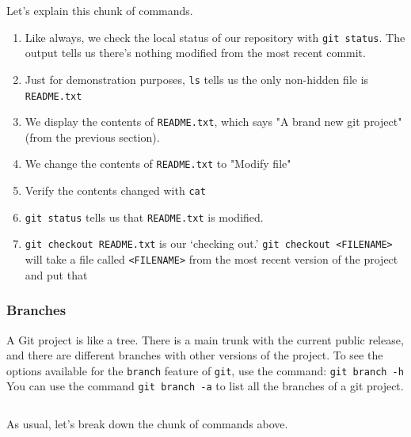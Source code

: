 \documentclass[11pt,fleqn]{article}
\theoremstyle{definition}
\begin{document}
Let's explain this chunk of commands.

\begin{enumerate}
\item Like always, we check the local status of our repository with \verb|git status|.
    The output tells us there's nothing modified from the most recent
    commit.

\item Just for demonstration purposes, \verb|ls| tells us the only non-hidden
    file is \verb|README.txt|

\item We display the contents of \verb|README.txt|, which says "A brand new git
    project" (from the previous section).

\item We change the contents of \verb|README.txt| to "Modify file"

\item Verify the contents changed with \verb|cat|

\item \verb|git status| tells us that \verb|README.txt| is modified.

\item \verb|git checkout README.txt| is our `checking out.' \verb|git checkout <FILENAME>|
    will take a file called \verb|<FILENAME>| from the most recent
    version of the project and put that 

\end{enumerate}

\subsubsection{Branches}
A Git project is like a tree. There is a main trunk with the current public
release, and there are different branches with other versions of the project. To
see the options available for the \verb|branch| feature of \verb|git|, use the
command: \texttt{git branch -h}\\
You can use the command \verb|git branch -a| to list all the branches of a git
project.

\begin{verbatim}
\end{verbatim}

As usual, let's break down the chunk of commands above.
\end{document}
